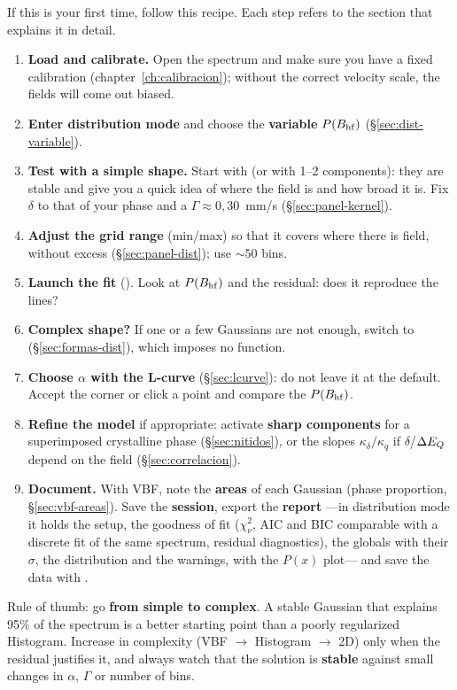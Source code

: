 If this is your first time, follow this recipe. Each step refers to the section that
explains it in detail.

\begin{enumerate}[nosep]
  \item \textbf{Load and calibrate.} Open the spectrum and make sure you have a fixed
        calibration (chapter~\ref{ch:calibracion}); without the correct velocity
        scale, the fields will come out biased.
  \item \textbf{Enter distribution mode} and choose the \textbf{variable} $P(B_{\mathrm{hf}})$
        (\S\ref{sec:dist-variable}).
  \item \textbf{Test with a simple shape.} Start with  (or 
        with 1--2 components): they are stable and give you a quick idea of where the
        field is and how broad it is. Fix $\delta$ to that of your phase and a
        $\Gamma \approx 0{,}30$~mm/s (\S\ref{sec:panel-kernel}).
  \item \textbf{Adjust the grid range} (min/max) so that it covers where there is
        field, without excess (\S\ref{sec:panel-dist}); use $\sim 50$ bins.
  \item \textbf{Launch the fit} (). Look at $P(B_{\mathrm{hf}})$ and the
        residual: does it reproduce the lines?
  \item \textbf{Complex shape?} If one or a few Gaussians are not enough, switch to
         (\S\ref{sec:formas-dist}), which imposes no function.
  \item \textbf{Choose $\alpha$ with the L-curve} (\S\ref{sec:lcurve}): do not leave
        it at the default. Accept the corner or click a point and compare the
        $P(B_{\mathrm{hf}})$.
  \item \textbf{Refine the model} if appropriate: activate \textbf{sharp components}
        for a superimposed crystalline phase (\S\ref{sec:nitidos}), or the slopes
        $\kappa_\delta/\kappa_q$ if $\delta$/$\Delta E_{Q}$ depend on the field
        (\S\ref{sec:correlacion}).
  \item \textbf{Document.} With VBF, note the \textbf{areas} of each Gaussian (phase
        proportion, \S\ref{sec:vbf-areas}). Save the \textbf{session}, export the
        \textbf{report} ---in distribution mode it holds the setup, the goodness of
        fit ($\chi^2_\nu$, AIC and BIC comparable with a discrete fit of the same
        spectrum, residual diagnostics), the globals with their $\sigma$, the
        distribution and the warnings, with the $P(x)$ plot--- and save the data
        with .
\end{enumerate}

\begin{truco}
Rule of thumb: go \textbf{from simple to complex}. A stable Gaussian that explains
95\% of the spectrum is a better starting point than a poorly regularized Histogram.
Increase in complexity (VBF $\to$ Histogram $\to$ 2D) only when the residual
justifies it, and always watch that the solution is \textbf{stable} against small
changes in $\alpha$, $\Gamma$ or number of bins.
\end{truco}
